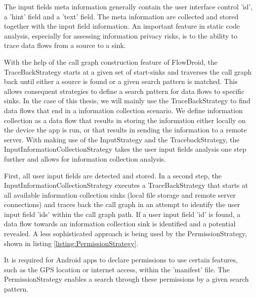 The input fields meta information generally contain the user interface control 'id', a 'hint' field and a 'text' field. 
The meta information are collected and stored together with the input field information.
An important feature in static code analysis, especially for assessing information privacy risks, is to the ability to trace data flows from a source to a sink.

With the help of the call graph construction feature of FlowDroid, the TraceBackStrategy starts at a given set of start-sinks and traverses the call graph back until either a source is found or a given search pattern is matched.
This allows consequent strategies to define a search pattern for data flows to specific sinks.
In the case of this thesis, we will mainly use the TraceBackStrategy to find data flows that end in a information collection scenario. 
We define information collection as a data flow that results in storing the information either locally on the device the app is run, or that results in sending the information to a remote server.
With making use of the InputStrategy and the TracebackStrategy, the InputInformationCollectionStrategy takes the user input fields analysis one step further and allows for information collection analysis.

First, all user input fields are detected and stored. 
In a second step, the InputInformationCollectionStrategy executes a TraceBackStrategy that starts at all available information collection sinks (local file storage and remote server connections) and traces back the call graph in an attempt to identify the user input field 'ids' within the call graph path.
If a user input field 'id' is found, a data flow towards an information collection sink is identified and a potential \ipr revealed.
A less sophisticated approach is being used by the PermissionStrategy, shown in listing \ref{listing:PermissionStrategy}.

It is required for Android apps to declare permissions to use certain features, such as the \acs{GPS} location or internet access, within the 'manifest' file.
The PermissionStrategy enables a search through these permissions by a given search pattern.

